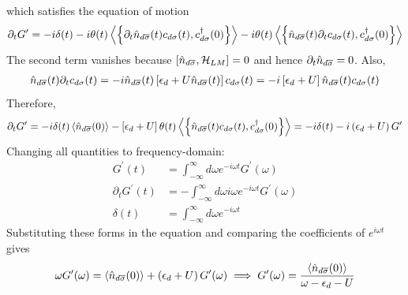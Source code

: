 \documentclass[12pt,twoside]{article}
\numberwithin{equation}{section}
\begin{document}
which satisfies the equation of motion
\begin{equation}\begin{aligned}
	\partial_t G^\prime = -i \delta(t) -i\theta(t) \left<\left\{\partial_t \hat n_{d\overline\sigma}(t)c_{d\sigma}(t), c^\dagger_{d\sigma}(0) \right\} \right> -i\theta(t) \left<\left\{\hat n_{d\overline\sigma}(t)\partial_t c_{d\sigma}(t), c^\dagger_{d\sigma}(0) \right\} \right>
\end{aligned}\end{equation}
The second term vanishes because \(\left[\hat n_{d\overline\sigma}, \mathcal{H}_{LM}\right] = 0\) and hence \(\partial_t \hat n_{d\overline\sigma} = 0\). Also,
\begin{equation}\begin{aligned}
	\hat n_{d\overline\sigma}(t)\partial_t c_{d\sigma}(t) = -i\hat n_{d\overline\sigma}(t)\left[\epsilon_d + U \hat n_{d\overline\sigma}(t)\right]c_{d\sigma}(t) = -i\left[\epsilon_d + U\right]\hat n_{d\overline\sigma}(t)c_{d\sigma}(t)
\end{aligned}\end{equation}
Therefore,
\begin{equation}\begin{aligned}
	\partial_t G^\prime = -i \delta(t) \left< \hat n_{d\overline\sigma}(0)\right>- \left[\epsilon_d + U\right]\theta(t) \left<\left\{\hat n_{d\overline\sigma}(t)c_{d\sigma}(t), c^\dagger_{d\sigma}(0) \right\} \right> = -i \delta(t) -i \left( \epsilon_d + U \right) G^\prime
\end{aligned}\end{equation}
Changing all quantities to frequency-domain:
\begin{equation}\begin{aligned}
	G^\prime(t) &= \int_{-\infty}^\infty d\omega e^{-i\omega t} G^\prime(\omega)\\
	\partial_t G^\prime(t) &= -\int_{-\infty}^\infty d\omega i \omega e^{-i\omega t} G^\prime(\omega)\\
	\delta(t) &= \int_{-\infty}^\infty d\omega e^{-i\omega t}
\end{aligned}\end{equation}
Substituting these forms in the equation and comparing the coefficients of \(e^{i\omega t}\) gives
\begin{equation}\begin{aligned}
	 \omega G^\prime(\omega) =  \left< \hat n_{d\overline\sigma}(0)\right> + \left( \epsilon_d + U \right) G^\prime(\omega)\implies G^\prime(\omega) = \frac{\left< \hat n_{d\overline\sigma}(0)\right>}{\omega - \epsilon_d - U}
\end{aligned}\end{equation}
\end{document}
